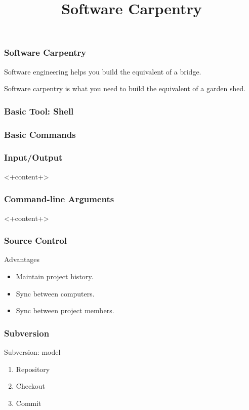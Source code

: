 
\title{Software Carpentry}


\begin{frame}[fragile]
\frametitle{Software Carpentry}

Software engineering helps you build the equivalent of a bridge.

Software carpentry is what you need to build the equivalent of a garden shed.

\end{frame}

\begin{frame}[fragile]
\frametitle{Basic Tool: Shell}

\end{frame}

\begin{frame}[fragile]
\frametitle{Basic Commands}

\end{frame}


\begin{frame}[fragile]
\frametitle{Input/Output}
<+content+>
\end{frame}

\begin{frame}[fragile]
\frametitle{Command-line Arguments}
<+content+>
\end{frame}

\begin{frame}[fragile]
\frametitle{Source Control}
\begin{block}{Advantages}
\begin{itemize}
\item Maintain project history.
\item Sync between computers.
\item Sync between project members.
\end{itemize}
\end{block}
\end{frame}

\begin{frame}[fragile]
\frametitle{Subversion}
\begin{block}{Subversion: model}
\begin{enumerate}
\item Repository
\item Checkout
\item Commit
\end{enumerate}
\end{block}
\end{frame}


